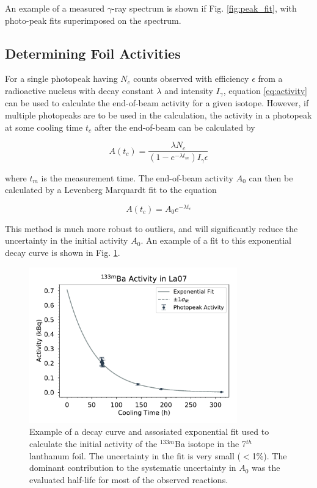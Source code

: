 \documentclass[aps,twocolumn,secnumarabic,balancelastpage,amsmath,amssymb,nofootinbib,floatfix]{revtex4-1}
\begin{document}
An example of a measured $\gamma$-ray spectrum is shown if Fig. \ref{fig:peak_fit}, with photo-peak fits superimposed on the spectrum.

\subsection{Determining Foil Activities}
\label{eob_activities}

For a single photopeak having $N_c$ counts observed with efficiency $\epsilon$ from a radioactive nucleus with decay constant $\lambda$ and intensity $I_{\gamma}$, equation \ref{eq:activity} can be used to calculate the end-of-beam activity for a given isotope.  However, if multiple photopeaks are to be used in the calculation, the activity in a photopeak at some cooling time $t_c$ after the end-of-beam can be calculated by

\begin{equation}
A(t_c) = \frac{\lambda N_c}{(1-e^{-\lambda t_m})I_{\gamma}\epsilon}
\end{equation}

where $t_m$ is the measurement time.  The end-of-beam activity $A_0$ can then be calculated by a Levenberg Marquardt fit to the equation

\begin{equation}
A(t_c) = A_0e^{-\lambda t_c}
\label{eq:decay}
\end{equation}

This method is much more robust to outliers, and will significantly reduce the uncertainty in the initial activity $A_0$.  An example of a fit to this exponential decay curve is shown in Fig. \ref{fig:decay_curves}.

\begin{figure}[htb]
\includegraphics[width=9cm]{decay_curves/La07_133BAm}
\caption{Example of a decay curve and assosiated exponential fit used to calculate the initial activity of the $^{133m}$Ba isotope in the 7$^{th}$ lanthanum foil.  The uncertainty in the fit is very small ($<$1\%). The dominant contribution to the systematic uncertainty in $A_0$ was the evaluated half-life for most of the observed reactions.
}
\label{fig:decay_curves}
\end{figure}
\end{document}
